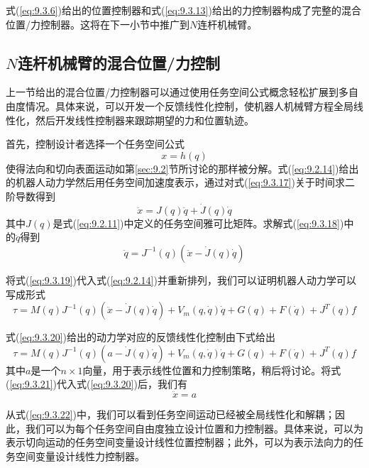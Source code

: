 \documentclass[12pt,a4paper]{ctexart}
\begin{document}
式(\ref{eq:9.3.6})给出的位置控制器和式(\ref{eq:9.3.13})给出的力控制器构成了完整的混合位置/力控制器。这将在下一小节中推广到$N$连杆机械臂。

\subsection{$N$连杆机械臂的混合位置/力控制}

上一节给出的混合位置/力控制器可以通过使用任务空间公式概念轻松扩展到多自由度情况。具体来说，可以开发一个反馈线性化控制，使机器人机械臂方程全局线性化，然后开发线性控制器来跟踪期望的力和位置轨迹。

首先，控制设计者选择一个任务空间公式
\begin{equation}\label{eq:9.3.17}
x = h(q)
\end{equation}
使得法向和切向表面运动如第\ref{sec:9.2}节所讨论的那样被分解。式(\ref{eq:9.2.14})给出的机器人动力学然后用任务空间加速度表示，通过对式(\ref{eq:9.3.17})关于时间求二阶导数得到
\begin{equation}\label{eq:9.3.18}
\ddot{x} = J(q)\ddot{q} + \dot{J}(q)\dot{q}
\end{equation}
其中$J(q)$是式(\ref{eq:9.2.11})中定义的任务空间雅可比矩阵。求解式(\ref{eq:9.3.18})中的$\ddot{q}$得到
\begin{equation}\label{eq:9.3.19}
\ddot{q} = J^{-1}(q)(\ddot{x} - \dot{J}(q)\dot{q})
\end{equation}

将式(\ref{eq:9.3.19})代入式(\ref{eq:9.2.14})并重新排列，我们可以证明机器人动力学可以写成形式
\begin{equation}\label{eq:9.3.20}
\tau = M(q)J^{-1}(q)(\ddot{x} - \dot{J}(q)\dot{q}) + V_m(q, \dot{q})\dot{q} + G(q) + F(\dot{q}) + J^T(q)f
\end{equation}

式(\ref{eq:9.3.20})给出的动力学对应的反馈线性化控制由下式给出
\begin{equation}\label{eq:9.3.21}
\tau = M(q)J^{-1}(q)(a - \dot{J}(q)\dot{q}) + V_m(q, \dot{q})\dot{q} + G(q) + F(\dot{q}) + J^T(q)f
\end{equation}
其中$a$是一个$n \times 1$向量，用于表示线性位置和力控制策略，稍后将讨论。将式(\ref{eq:9.3.21})代入式(\ref{eq:9.3.20})后，我们有
\begin{equation}\label{eq:9.3.22}
\ddot{x} = a
\end{equation}

从式(\ref{eq:9.3.22})中，我们可以看到任务空间运动已经被全局线性化和解耦；因此，我们可以为每个任务空间自由度独立设计位置和力控制器。具体来说，可以为表示切向运动的任务空间变量设计线性位置控制器；此外，可以为表示法向力的任务空间变量设计线性力控制器。
\end{document}

